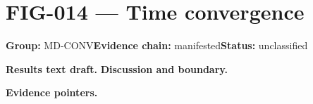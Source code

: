 \clearpage
\section{FIG-014 --- Time convergence}
\label{figpage:fig-014}
\textbf{Group:} MD-CONV\quad \textbf{Evidence chain:} manifested\quad \textbf{Status:} unclassified

\textbf{Results text draft.} 
\textbf{Discussion and boundary.} 


\textbf{Evidence pointers.}



\vfill
